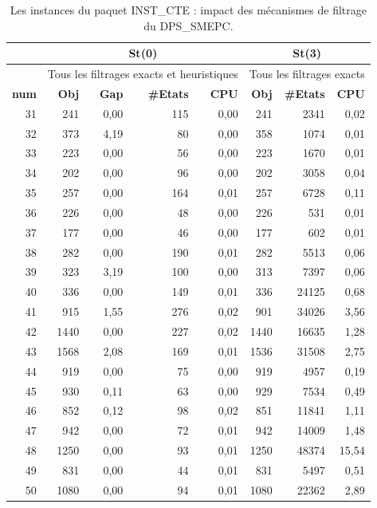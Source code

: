 \begin{table}[H]
	\centering
	\small
	\begin{tabular}{|r|rrrr|rrr|}
		\toprule
		\hline
		\rowcolor{cyan}	&\multicolumn{4}{c|}{\textbf{St(0)}} & \multicolumn{3}{c|}{\textbf{St(3)}}\\ \hline
		\midrule
		
		\hline
		\rowcolor{cyan}	&\multicolumn{4}{c|}{ \scriptsize{Tous les filtrages exacts et heuristiques}} & \multicolumn{3}{c|}{\scriptsize{Tous les filtrages exacts}}
		\\ \hline
		
		\midrule
		\rowcolor{cyan}	\textbf{num} &\textbf{Obj} & \textbf{Gap} & \textbf{\#Etats} & \textbf{CPU} &\textbf{Obj} & \textbf{\#Etats} & \textbf{CPU}   \\ \hline
		\midrule
		31	&	241	&	0,00	&	115	&	0,00	&	241	&	2341	&	0,02	\\ \hline
		32	&	373	&	4,19	&	80	&	0,00	&	358	&	1074	&	0,01	\\ \hline
		33	&	223	&	0,00	&	56	&	0,00	&	223	&	1670	&	0,01	\\ \hline
		34	&	202	&	0,00	&	96	&	0,00	&	202	&	3058	&	0,04	\\ \hline
		35	&	257	&	0,00	&	164	&	0,01	&	257	&	6728	&	0,11	\\ \hline
		36	&	226	&	0,00	&	48	&	0,00	&	226	&	531	&	0,01	\\ \hline
		37	&	177	&	0,00	&	46	&	0,00	&	177	&	602	&	0,01	\\ \hline
		38	&	282	&	0,00	&	190	&	0,01	&	282	&	5513	&	0,06	\\ \hline
		39	&	323	&	3,19	&	100	&	0,00	&	313	&	7397	&	0,06	\\ \hline
		40	&	336	&	0,00	&	149	&	0,01	&	336	&	24125	&	0,68	\\ \hline
		41	&	915	&	1,55	&	276	&	0,02	&	901	&	34026	&	3,56	\\ \hline
		42	&	1440	&	0,00	&	227	&	0,02	&	1440	&	16635	&	1,28	\\ \hline
		43	&	1568	&	2,08	&	169	&	0,01	&	1536	&	31508	&	2,75	\\ \hline
		44	&	919	&	0,00	&	75	&	0,00	&	919	&	4957	&	0,19	\\ \hline
		45	&	930	&	0,11	&	63	&	0,00	&	929	&	7534	&	0,49	\\ \hline
		46	&	852	&	0,12	&	98	&	0,02	&	851	&	11841	&	1,11	\\ \hline
		47	&	942	&	0,00	&	72	&	0,01	&	942	&	14009	&	1,48	\\ \hline
		48	&	1250	&	0,00	&	93	&	0,01	&	1250	&	48374	&	15,54	\\ \hline
		49	&	831	&	0,00	&	44	&	0,01	&	831	&	5497	&	0,51	\\ \hline
		50	&	1080	&	0,00	&	94	&	0,01	&	1080	&	22362	&	2,89	\\ \hline
		
		\bottomrule
	\end{tabular}%
	\caption{Les instances du paquet INST\_CTE : impact des mécanismes de filtrage du DPS\_SMEPC.}
	\label{BSUPPipe2}%
\end{table}%


